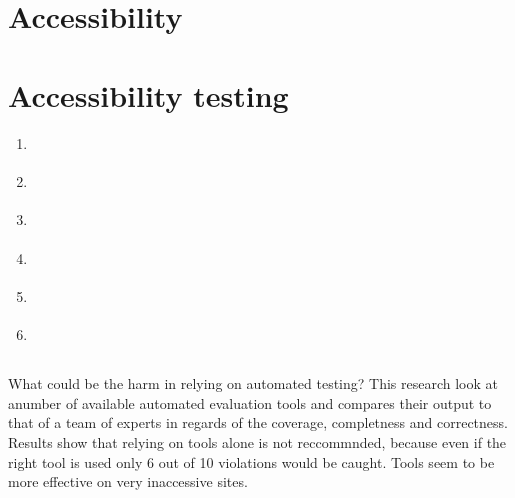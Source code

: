 \documentclass{master_thesis}
\begin{document}
\section{Accessibility}
\section{Accessibility testing}
\begin{enumerate}
	\item \cite{DequeSystems2021}
	\item \cite{AbouZahra2017}
	\item \cite{Sane2021}
	\item \cite{Thornton2022}
	\item \cite{RybinKoob2022}
	\item \cite{Ismailova2022}
\end{enumerate}

\subsection{\citep{Vigo2013}}
What could be the harm in relying on automated testing? This research look at anumber of available automated evaluation tools and compares their output to that of a team of experts in regards of the coverage, completness and correctness. Results show that relying on tools alone is not reccommnded, because even if the right tool is used only 6 out of 10 violations would be caught. Tools seem to be more effective on very inaccessive sites.


\printbibliography
\end{document}
